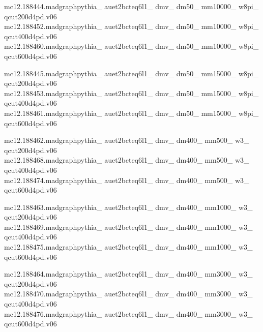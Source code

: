 mc12.188444.madgraphpythia\_ auet2bcteq6l1\_ dmv\_ dm50\_ mm10000\_ w8pi\_ \\ qcut200d4pd.v06\\
mc12.188452.madgraphpythia\_ auet2bcteq6l1\_ dmv\_ dm50\_ mm10000\_ w8pi\_ \\ qcut400d4pd.v06\\
mc12.188460.madgraphpythia\_ auet2bcteq6l1\_ dmv\_ dm50\_ mm10000\_ w8pi\_ \\ qcut600d4pd.v06

mc12.188445.madgraphpythia\_ auet2bcteq6l1\_ dmv\_ dm50\_ mm15000\_ w8pi\_ \\ qcut200d4pd.v06\\
mc12.188453.madgraphpythia\_ auet2bcteq6l1\_ dmv\_ dm50\_ mm15000\_ w8pi\_ \\ qcut400d4pd.v06\\
mc12.188461.madgraphpythia\_ auet2bcteq6l1\_ dmv\_ dm50\_ mm15000\_ w8pi\_ \\ qcut600d4pd.v06

mc12.188462.madgraphpythia\_ auet2bcteq6l1\_ dmv\_ dm400\_ mm500\_ w3\_ \\ qcut200d4pd.v06\\
mc12.188468.madgraphpythia\_ auet2bcteq6l1\_ dmv\_ dm400\_ mm500\_ w3\_ \\ qcut400d4pd.v06\\
mc12.188474.madgraphpythia\_ auet2bcteq6l1\_ dmv\_ dm400\_ mm500\_ w3\_ \\ qcut600d4pd.v06

mc12.188463.madgraphpythia\_ auet2bcteq6l1\_ dmv\_ dm400\_ mm1000\_ w3\_ \\ qcut200d4pd.v06\\
mc12.188469.madgraphpythia\_ auet2bcteq6l1\_ dmv\_ dm400\_ mm1000\_ w3\_ \\ qcut400d4pd.v06\\
mc12.188475.madgraphpythia\_ auet2bcteq6l1\_ dmv\_ dm400\_ mm1000\_ w3\_ \\ qcut600d4pd.v06

mc12.188464.madgraphpythia\_ auet2bcteq6l1\_ dmv\_ dm400\_ mm3000\_ w3\_ \\ qcut200d4pd.v06\\
mc12.188470.madgraphpythia\_ auet2bcteq6l1\_ dmv\_ dm400\_ mm3000\_ w3\_ \\ qcut400d4pd.v06\\
mc12.188476.madgraphpythia\_ auet2bcteq6l1\_ dmv\_ dm400\_ mm3000\_ w3\_ \\ qcut600d4pd.v06


